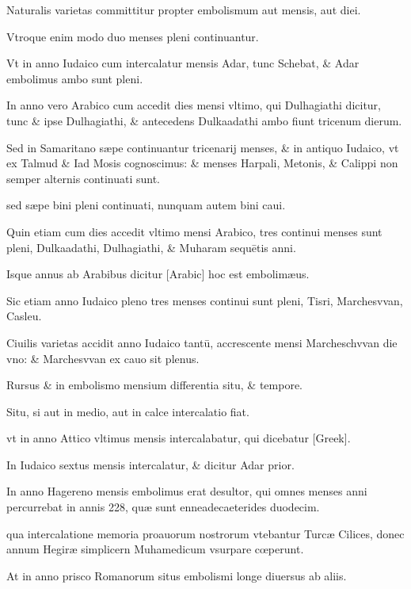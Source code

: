 \begin{parnumbers}

Naturalis varietas committitur propter embolismum
aut mensis, aut diei.

Vtroque enim modo duo menses pleni continuantur.

Vt in anno Iudaico cum intercalatur mensis Adar, tunc
Schebat, \& Adar embolimus ambo sunt pleni.

In anno vero Arabico
cum accedit dies mensi vltimo, qui Dulhagiathi dicitur, tunc \& ipse
Dulhagiathi, \& antecedens Dulkaadathi ambo fiunt tricenum dierum.

Sed in Samaritano sæpe continuantur tricenarij menses, \& in antiquo
Iudaico, vt ex Talmud \& Iad Mosis cognoscimus: \& menses Harpali,
Metonis, \& Calippi non semper alternis continuati sunt.

sed sæpe bini
pleni continuati, nunquam autem bini caui.

Quin etiam cum dies accedit
vltimo mensi Arabico, tres continui menses sunt pleni, Dulkaadathi,
Dulhagiathi, \& Muharam sequētis anni.

Isque annus ab Arabibus
dicitur \textarabic{[Arabic]} hoc est embolimæus.

Sic etiam anno Iudaico pleno
tres menses continui sunt pleni, Tisri, Marchesvvan, Casleu.

Ciuilis
varietas accidit anno Iudaico tantū, accrescente mensi Marcheschvvan
die vno: \& Marchesvvan ex cauo sit plenus.

Rursus \& in embolismo
mensium differentia situ, \& tempore.

Situ, si aut in medio, aut in calce
intercalatio fiat.

vt in anno Attico vltimus mensis intercalabatur, qui
dicebatur \textgreek{[Greek]}.

In Iudaico sextus mensis intercalatur, \&
dicitur Adar prior.

In anno Hagereno mensis embolimus erat desultor,
qui omnes menses anni percurrebat in annis 228, quæ sunt enneadecaeterides
duodecim.

qua intercalatione memoria proauorum nostrorum
vtebantur Turcæ Cilices, donec annum Hegiræ simplicern 
Muhamedicum vsurpare cœperunt.

At in anno prisco Romanorum
situs embolismi longe diuersus ab aliis.


\end{parnumbers}
